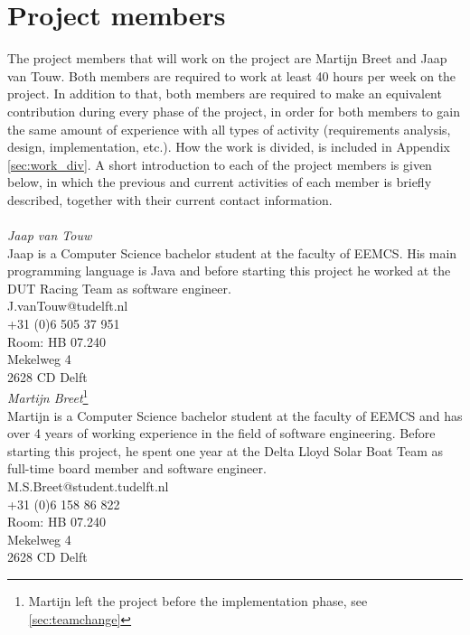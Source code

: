 \section{Project members}
\label{sec:proj_mem}
The project members that will work on the project are Martijn Breet and Jaap van Touw. Both members are required to work at least 40 hours per week on the project. In addition to that, both members are required to make an equivalent contribution during every phase of the project, in order for both members to gain the same amount of experience with all types of activity (requirements analysis, design, implementation, etc.). How the work is divided, is included in Appendix \ref{sec:work_div}. A short introduction to each of the project members is given below, in which the previous and current activities of each member is briefly described, together with their current contact information.\\
\noindent\\
\textit{Jaap van Touw}\\
Jaap is a Computer Science bachelor student at the faculty of EEMCS. His main programming language is Java and before starting this project he worked at the DUT Racing Team as software engineer.\\

\noindent
J.vanTouw@tudelft.nl\\
+31 (0)6 505 37 951\\
Room: HB 07.240\\
Mekelweg 4\\
2628 CD Delft\\

\noindent
\textit{Martijn Breet}\footnote{Martijn left the project before the implementation phase, see \ref{sec:teamchange}}\\
Martijn is a Computer Science bachelor student at the faculty of EEMCS and has over 4 years of working experience in the field of software engineering.  Before starting this project, he spent one year at the Delta Lloyd Solar Boat Team as full-time board member and software engineer.\\

\noindent
M.S.Breet@student.tudelft.nl \\
+31 (0)6 158 86 822\\
Room: HB 07.240\\
Mekelweg 4\\
2628 CD Delft\\
